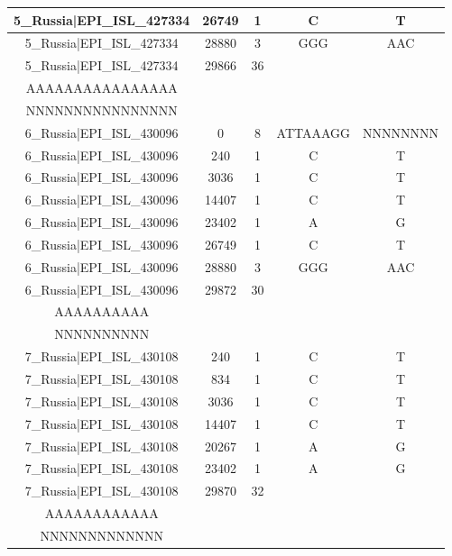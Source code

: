 \documentclass[a4paper,10pt]{article}
\begin{document}
\begin{longtable}{@{}ccccc@{}}
5\_Russia|EPI\_ISL\_427334 & 26749 & 1 & C & T \\* \midrule
5\_Russia|EPI\_ISL\_427334 & 28880 & 3 & GGG & AAC \\* \midrule
5\_Russia|EPI\_ISL\_427334 & 29866 & 36 & \begin{tabular}[c]{@{}c@{}}GACAAAAAAAAAAAAAAAAA\\ AAAAAAAAAAAAAAAA\end{tabular} & \begin{tabular}[c]{@{}c@{}}NNNNNNNNNNNNNNNNNNNN\\ NNNNNNNNNNNNNNNN\end{tabular} \\* \midrule
6\_Russia|EPI\_ISL\_430096 & 0 & 8 & ATTAAAGG & NNNNNNNN \\* \midrule
6\_Russia|EPI\_ISL\_430096 & 240 & 1 & C & T \\* \midrule
6\_Russia|EPI\_ISL\_430096 & 3036 & 1 & C & T \\* \midrule
6\_Russia|EPI\_ISL\_430096 & 14407 & 1 & C & T \\* \midrule
6\_Russia|EPI\_ISL\_430096 & 23402 & 1 & A & G \\* \midrule
6\_Russia|EPI\_ISL\_430096 & 26749 & 1 & C & T \\* \midrule
6\_Russia|EPI\_ISL\_430096 & 28880 & 3 & GGG & AAC \\* \midrule
6\_Russia|EPI\_ISL\_430096 & 29872 & 30 & \begin{tabular}[c]{@{}c@{}}AAAAAAAAAAAAAAAAAAAA\\ AAAAAAAAAA\end{tabular} & \begin{tabular}[c]{@{}c@{}}NNNNNNNNNNNNNNNNNNNN\\ NNNNNNNNNN\end{tabular} \\* \midrule
7\_Russia|EPI\_ISL\_430108 & 240 & 1 & C & T \\* \midrule
7\_Russia|EPI\_ISL\_430108 & 834 & 1 & C & T \\* \midrule
7\_Russia|EPI\_ISL\_430108 & 3036 & 1 & C & T \\* \midrule
7\_Russia|EPI\_ISL\_430108 & 14407 & 1 & C & T \\* \midrule
7\_Russia|EPI\_ISL\_430108 & 20267 & 1 & A & G \\* \midrule
7\_Russia|EPI\_ISL\_430108 & 23402 & 1 & A & G \\* \midrule
7\_Russia|EPI\_ISL\_430108 & 29870 & 32 & \begin{tabular}[c]{@{}c@{}}AAAAAAAAAAAAAAAAAAAA\\ AAAAAAAAAAAA\end{tabular} & \begin{tabular}[c]{@{}c@{}}NNNNNNNNNNNNNNNNNNN\\ NNNNNNNNNNNNN\end{tabular} \\* \bottomrule
\end{longtable}
\end{document}

